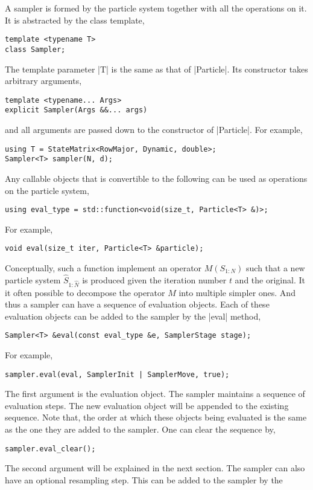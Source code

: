 A sampler is formed by the particle system together with all the operations on
it. It is abstracted by the class template,
\begin{verbatim}
template <typename T>
class Sampler;
\end{verbatim}
The template parameter |T| is the same as that of |Particle|. Its constructor
takes arbitrary arguments,
\begin{verbatim}
template <typename... Args>
explicit Sampler(Args &&... args)
\end{verbatim}
and all arguments are passed down to the constructor of |Particle|. For
example,
\begin{verbatim}
using T = StateMatrix<RowMajor, Dynamic, double>;
Sampler<T> sampler(N, d);
\end{verbatim}
Any callable objects that is convertible to the following can be used as
operations on the particle system,
\begin{verbatim}
using eval_type = std::function<void(size_t, Particle<T> &)>;
\end{verbatim}
For example,
\begin{verbatim}
void eval(size_t iter, Particle<T> &particle);
\end{verbatim}
Conceptually, such a function implement an operator $M(S_{1:N})$ such that a
new particle system $\hat{S}_{1:\hat{N}}$ is produced given the iteration
number $t$ and the original. It it often possible to decompose the operator $M$
into multiple simpler ones. And thus a sampler can have a sequence of
evaluation objects. Each of these evaluation objects can be added to the
sampler by the |eval| method,
\begin{verbatim}
Sampler<T> &eval(const eval_type &e, SamplerStage stage);
\end{verbatim}
For example,
\begin{verbatim}
sampler.eval(eval, SamplerInit | SamplerMove, true);
\end{verbatim}
The first argument is the evaluation object. The sampler maintains a sequence
of evaluation steps. The new evaluation object will be appended to the existing
sequence. Note that, the order at which these objects being evaluated is the
same as the one they are added to the sampler. One can clear the sequence by,
\begin{verbatim}
sampler.eval_clear();
\end{verbatim}
The second argument will be explained in the next section. The sampler can also
have an optional resampling step. This can be added to the sampler by the
